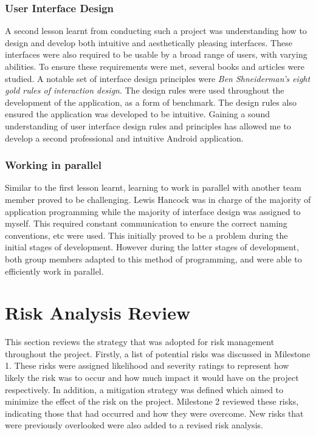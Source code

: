 \documentclass[11pt,a4paper]{report}
\begin{document}
\subsubsection{User Interface Design}
A second lesson learnt from conducting such a project was understanding how to design and develop both intuitive and aesthetically pleasing interfaces. These interfaces were also required to be usable by a broad range of users, with varying abilities. To ensure these requirements were met, several books and articles were studied. A notable set of interface design principles were \emph{Ben Shneiderman's eight gold rules of interaction design}. The design rules were used throughout the development of the application, as a form of benchmark. The design rules also ensured the application was developed to be intuitive. Gaining a sound understanding of user interface design rules and principles has allowed me to develop a second professional and intuitive Android application.   

\subsubsection{Working in parallel}
Similar to the first lesson learnt, learning to work in parallel with another team member proved to be challenging. Lewis Hancock was in charge of the majority of application programming while the majority of interface design was assigned to myself. This required constant communication to ensure the correct naming conventions, etc were used. This initially proved to be a problem during the initial stages of development. However during the latter stages of development, both group members adapted to this method of programming, and were able to efficiently work in parallel.

\section{Risk Analysis Review}
\label{sec:risk-analysis-review}
This section reviews the strategy that was adopted for risk management throughout the project. Firstly, a list of potential risks was discussed in Milestone 1. These risks were assigned likelihood and severity ratings to represent how likely the risk was to occur and how much impact it would have on the project respectively. In addition, a mitigation strategy was defined which aimed to minimize the effect of the risk on the project. Milestone 2 reviewed these risks, indicating those that had occurred and how they were overcome. New risks that were previously overlooked were also added to a revised risk analysis.
\end{document}

